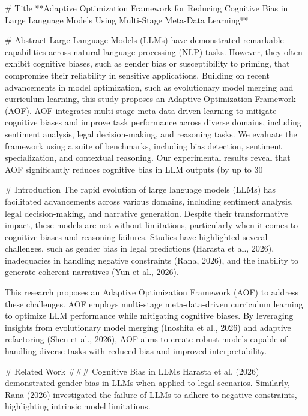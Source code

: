 # Title
**Adaptive Optimization Framework for Reducing Cognitive Bias in Large Language Models Using Multi-Stage Meta-Data Learning**

# Abstract
Large Language Models (LLMs) have demonstrated remarkable capabilities across natural language processing (NLP) tasks. However, they often exhibit cognitive biases, such as gender bias or susceptibility to priming, that compromise their reliability in sensitive applications. Building on recent advancements in model optimization, such as evolutionary model merging and curriculum learning, this study proposes an Adaptive Optimization Framework (AOF). AOF integrates multi-stage meta-data-driven learning to mitigate cognitive biases and improve task performance across diverse domains, including sentiment analysis, legal decision-making, and reasoning tasks. We evaluate the framework using a suite of benchmarks, including bias detection, sentiment specialization, and contextual reasoning. Our experimental results reveal that AOF significantly reduces cognitive bias in LLM outputs (by up to 30%

# Introduction
The rapid evolution of large language models (LLMs) has facilitated advancements across various domains, including sentiment analysis, legal decision-making, and narrative generation. Despite their transformative impact, these models are not without limitations, particularly when it comes to cognitive biases and reasoning failures. Studies have highlighted several challenges, such as gender bias in legal predictions (Harasta et al., 2026), inadequacies in handling negative constraints (Rana, 2026), and the inability to generate coherent narratives (Yun et al., 2026).

This research proposes an Adaptive Optimization Framework (AOF) to address these challenges. AOF employs multi-stage meta-data-driven curriculum learning to optimize LLM performance while mitigating cognitive biases. By leveraging insights from evolutionary model merging (Inoshita et al., 2026) and adaptive refactoring (Shen et al., 2026), AOF aims to create robust models capable of handling diverse tasks with reduced bias and improved interpretability.

# Related Work
### Cognitive Bias in LLMs
Harasta et al. (2026) demonstrated gender bias in LLMs when applied to legal scenarios. Similarly, Rana (2026) investigated the failure of LLMs to adhere to negative constraints, highlighting intrinsic model limitations.

